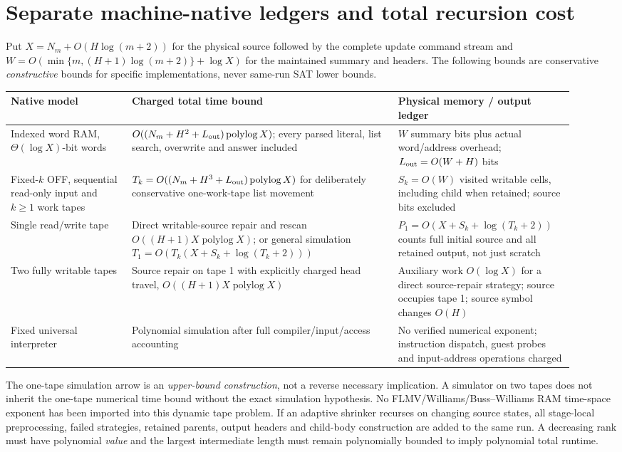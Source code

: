 \documentclass[11pt]{article}
\newcommand{\polylog}{\operatorname{polylog}}
\begin{document}
\section{Separate machine-native ledgers and total recursion cost}
Put $X=N_m+O(H\log(m+2))$ for the physical source followed by the complete update command stream and $W=O(\min\{m,(H+1)\log(m+2)\}+\log X)$ for the maintained summary and headers. The following bounds are conservative \emph{constructive} bounds for specific implementations, never same-run SAT lower bounds.
\begin{center}\small
\begin{tabular}{p{0.20\linewidth}p{0.44\linewidth}p{0.28\linewidth}}
\toprule
Native model & Charged total time bound & Physical memory / output ledger\\
\midrule
Indexed word RAM, $\Theta(\log X)$-bit words & $O((N_m+H^2+L_{\rm out})\polylog X)$; every parsed literal, list search, overwrite and answer included & $W$ summary bits plus actual word/address overhead; $L_{\rm out}=O(W+H)$ bits\\
Fixed-$k$ OFF, sequential read-only input and $k\ge1$ work tapes & $T_k=O((N_m+H^3+L_{\rm out})\polylog X)$ for deliberately conservative one-work-tape list movement & $S_k=O(W)$ visited writable cells, including child when retained; source bits excluded\\
Single read/write tape & Direct writable-source repair and rescan $O((H+1)X\polylog X)$; or general simulation $T_1=O(T_k(X+S_k+\log(T_k+2)))$ & $P_1=O(X+S_k+\log(T_k+2))$ counts full initial source and all retained output, not just scratch\\
Two fully writable tapes & Source repair on tape 1 with explicitly charged head travel, $O((H+1)X\polylog X)$ & Auxiliary work $O(\log X)$ for a direct source-repair strategy; source occupies tape 1; source symbol changes $O(H)$\\
Fixed universal interpreter & Polynomial simulation after full compiler/input/access accounting & No verified numerical exponent; instruction dispatch, guest probes and input-address operations charged\\
\bottomrule
\end{tabular}
\end{center}
The one-tape simulation arrow is an \emph{upper-bound construction}, not a reverse necessary implication. A simulator on two tapes does not inherit the one-tape numerical time bound without the exact simulation hypothesis. No FLMV/Williams/Buss--Williams RAM time-space exponent has been imported into this dynamic tape problem. If an adaptive shrinker recurses on changing source states, all stage-local preprocessing, failed strategies, retained parents, output headers and child-body construction are added to the same run. A decreasing rank must have polynomial \emph{value} and the largest intermediate length must remain polynomially bounded to imply polynomial total runtime.
\end{document}
